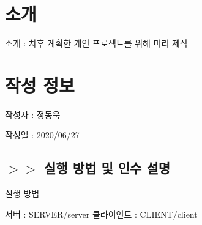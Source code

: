 \hypertarget{index_intro}{}\section{소개}\label{index_intro}

\begin{DoxyItemize}
\item 소개 \-: 차후 계획한 개인 프로젝트를 위해 미리 제작 
\end{DoxyItemize}\hypertarget{index_CreateInfo}{}\section{작성 정보}\label{index_CreateInfo}

\begin{DoxyItemize}
\item 작성자 \-: 정동욱
\item 작성일 \-: 2020/06/27 
\end{DoxyItemize}\hypertarget{index_exec}{}\subsection{$>$$>$ 실행 방법 및 인수 설명}\label{index_exec}

\begin{DoxyItemize}
\item 실행 방법\par
 서버 \-: S\-E\-R\-V\-E\-R/server 클라이언트 \-: C\-L\-I\-E\-N\-T/client 
\end{DoxyItemize}